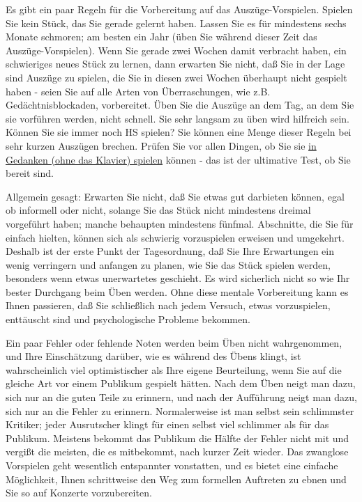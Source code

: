 Es gibt ein paar Regeln für die Vorbereitung auf das Auszüge-Vorspielen.
Spielen Sie kein Stück, das Sie gerade gelernt haben.
Lassen Sie es für mindestens sechs Monate schmoren; am besten ein Jahr (üben Sie während dieser Zeit das Auszüge-Vorspielen).
Wenn Sie gerade zwei Wochen damit verbracht haben, ein schwieriges neues Stück zu lernen, dann erwarten Sie nicht, daß Sie in der Lage sind Auszüge zu spielen, die Sie in diesen zwei Wochen überhaupt nicht gespielt haben - seien Sie auf alle Arten von Überraschungen, wie z.B. Gedächtnisblockaden, vorbereitet.
Üben Sie die Auszüge an dem Tag, an dem Sie sie vorführen werden, nicht schnell.
Sie sehr langsam zu üben wird hilfreich sein.
Können Sie sie immer noch HS spielen?
Sie können eine Menge dieser Regeln bei sehr kurzen Auszügen brechen.
Prüfen Sie vor allen Dingen, ob Sie sie \hyperref[c1ii12mental]{in Gedanken (ohne das Klavier) spielen} können - das ist der ultimative Test, ob Sie bereit sind.

Allgemein gesagt: Erwarten Sie nicht, daß Sie etwas gut darbieten können, egal ob informell oder nicht, solange Sie das Stück nicht mindestens dreimal vorgeführt haben; manche behaupten mindestens fünfmal.
Abschnitte, die Sie für einfach hielten, können sich als schwierig vorzuspielen erweisen und umgekehrt.
Deshalb ist der erste Punkt der Tagesordnung, daß Sie Ihre Erwartungen ein wenig verringern und anfangen zu planen, wie Sie das Stück spielen werden, besonders wenn etwas unerwartetes geschieht.
Es wird sicherlich nicht so wie Ihr bester Durchgang beim Üben werden.
Ohne diese mentale Vorbereitung kann es Ihnen passieren, daß Sie schließlich nach jedem Versuch, etwas vorzuspielen, enttäuscht sind und psychologische Probleme bekommen.

Ein paar Fehler oder fehlende Noten werden beim Üben nicht wahrgenommen, und Ihre Einschätzung darüber, wie es während des Übens klingt, ist wahrscheinlich viel optimistischer als Ihre eigene Beurteilung, wenn Sie auf die gleiche Art vor einem Publikum gespielt hätten.
Nach dem Üben neigt man dazu, sich nur an die guten Teile zu erinnern, und nach der Aufführung neigt man dazu, sich nur an die Fehler zu erinnern.
Normalerweise ist man selbst sein schlimmster Kritiker; jeder Ausrutscher klingt für einen selbst viel schlimmer als für das Publikum.
Meistens bekommt das Publikum die Hälfte der Fehler nicht mit und vergißt die meisten, die es mitbekommt, nach kurzer Zeit wieder.
Das zwanglose Vorspielen geht wesentlich entspannter vonstatten, und es bietet eine einfache Möglichkeit, Ihnen schrittweise den Weg zum formellen Auftreten zu ebnen und Sie so auf Konzerte vorzubereiten.

